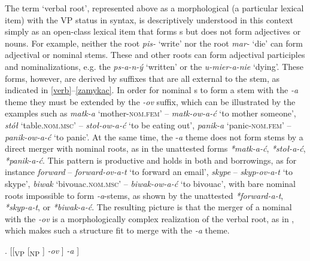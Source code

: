 The term `verbal root', represented above as a morphological  (a particular lexical item) with the VP status in syntax, is descriptively understood in this context simply as an open-class lexical item that forms s but does not form adjectives or nouns.
For example, neither the  root \textit{pis-} `write' nor the  root \textit{mar-} `die' can form adjectival or nominal stems. These and other roots can form adjectival participles and nominalizations, e.g. the  \textit{ps-a-n-\'y} `written' or the  \textit{u-mier-a-nie} `dying'. These forms, however, are derived by suffixes that are all external to the  stem, as indicated in \ref{verb}--\ref{zamykac}. 
In order for nominal s to form a  stem with the \textit{-a} theme they must be extended by the \textit{-ov} suffix, which can be illustrated by the  examples such as \textit{matk-a} `mother-\textsc{nom.fem}' -- \textit{matk-ow-a-\'c} `to mother someone', \textit{st\'o\l} {} `table.\textsc{nom.msc}' -- \textit{sto\l-ow-a-\'c} `to be eating out', \textit{panik-a} `panic-\textsc{nom.fem}' -- \textit{panik-ow-a-\'c} `to panic'. At the same time, the -\textit{a} theme does not form  stems by a direct merger with nominal roots, as in the unattested forms \textit{*matk-a-\'c}, \textit{*sto\l-a-\'c}, \textit{*panik-a-\'c}.  This pattern is productive and holds in both  and  borrowings, as for instance \textit{forward} -- \textit{forward-ov-a-t} `to forward an email', \textit{skype} -- \textit{skyp-ov-a-t} `to skype', \textit{biwak} `bivouac.\textsc{nom.msc}' -- \textit{biwak-ow-a-\'c} `to bivouac', with bare nominal roots impossible to form \textit{-a}-stems, as shown by the unattested \textit{*forward-a-t}, \textit{*skyp-a-t}, or \textit{*biwak-a-\'c}. 
The resulting picture is that the merger of a nominal  with the \textit{-ov} is a morphologically complex realization of the verbal root, as in \Next, which makes such a structure fit to merge with the \textit{-a} theme. 

\ex. [[\textsubscript{VP} [\textsubscript{NP}  ] \textit{-ov} ] \textit{-a} ]


